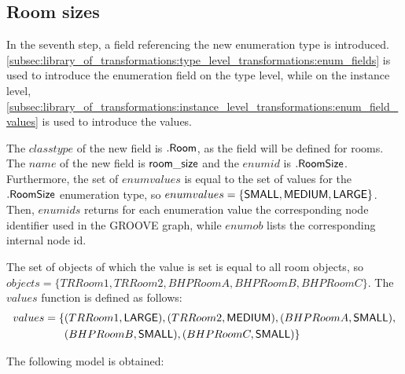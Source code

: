 \subsection{Room sizes}
\label{sec:application:building_the_model:room_sizes}

In the seventh step, a field referencing the new enumeration type is introduced. \cref{subsec:library_of_transformations:type_level_transformations:enum_fields} is used to introduce the enumeration field on the type level, while on the instance level, \cref{subsec:library_of_transformations:instance_level_transformations:enum_field_values} is used to introduce the values.

The $classtype$ of the new field is $.\mathsf{Room}$, as the field will be defined for rooms. The $name$ of the new field is $\mathsf{room\_size}$ and the $enumid$ is $.\mathsf{RoomSize}$. Furthermore, the set of $enumvalues$ is equal to the set of values for the $.\mathsf{RoomSize}$ enumeration type, so $enumvalues = \{\mathsf{SMALL}, \mathsf{MEDIUM}, \mathsf{LARGE}\}$. Then, $enumids$ returns for each enumeration value the corresponding node identifier used in the GROOVE graph, while $enumob$ lists the corresponding internal node id.

The set of objects of which the value is set is equal to all room objects, so $objects = \{TRRoom1, TRRoom2, BHPRoomA, BHPRoomB, BHPRoomC\}$. The $values$ function is defined as follows:
\begin{align*}
    values = \{&(TRRoom1, \mathsf{LARGE}), (TRRoom2, \mathsf{MEDIUM}), (BHPRoomA, \mathsf{SMALL}), \\&(BHPRoomB, \mathsf{SMALL}), (BHPRoomC, \mathsf{SMALL})\}
\end{align*}

The following model is obtained:


